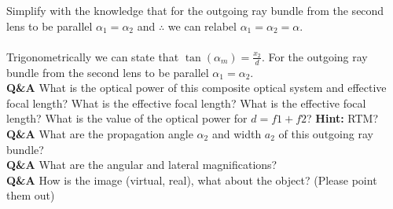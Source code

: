 \documentclass[main.tex]{subfiles}
\begin{document}


\newpage

Simplify with the knowledge that for the outgoing ray bundle from the second lens to be parallel $\alpha_1 = \alpha_2$ and $\therefore$ we can relabel $\alpha_1 = \alpha_2 =\alpha$.\\

















\\ Trigonometrically we can state that $\tan(\alpha_m) = \frac{x_2}{d}$. For the outgoing ray bundle from the second lens to be parallel $\alpha_1 = \alpha_2$.\\

\textbf{Q\&A} What is the optical power of this composite optical system and effective focal length? What is the effective focal length? What is the effective focal length? What is the value of the optical power for $d=f1+f2$? \textbf{Hint:} RTM?\\

\textbf{Q\&A} What are the propagation angle $\alpha_2$ and width $a_2$ of this outgoing ray bundle? \\

\textbf{Q\&A} What are the angular and lateral magnifications?\\

\textbf{Q\&A} How is the image (virtual, real), what about the object? (Please point them out)\\

\newpage
\end{document}
